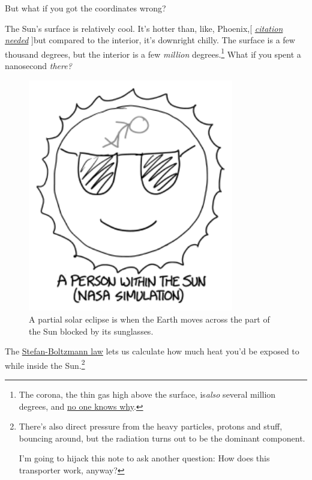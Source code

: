 {{But what if you got the coordinates wrong?}

{The Sun's surface is relatively cool. It's hotter than, like, Phoenix,[ \emph{ \href{https://www.google.com/search?tbm=isch&q=gibson+citation}{citation needed}} ]but compared to the interior, it's downright chilly. The surface is a few thousand degrees, but the interior is a few \emph{million} degrees.{\footnote{The corona, the thin gas high above the surface, is\emph{also} several million degrees, and \href{http://en.wikipedia.org/wiki/Corona\#Coronal\_heating\_problem} {no one knows why}.} } What if you spent a nanosecond \emph{there?} }

\begin{figure}[!htbp]
\centering
\includegraphics[scale=0.5, max width=0.8\textwidth]{imgs/a/115/want.png}
\caption{A partial solar eclipse is when the Earth moves across the part of the Sun blocked by its sunglasses.}
\end{figure}

{The \href{http://hyperphysics.phy-astr.gsu.edu/hbase/thermo/stefan.html}{Stefan-Boltzmann law} lets us calculate how much heat you'd be exposed to while inside the Sun.{\footnote{There's also direct pressure from the heavy particles, protons and stuff, bouncing around, but the radiation turns out to be the dominant component.

I'm going to hijack this note to ask another question: How does this transporter work, anyway?

}}}}
